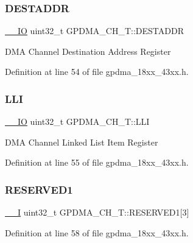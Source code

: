 \subsubsection{\texorpdfstring{D\+E\+S\+T\+A\+D\+DR}{DESTADDR}}
{\footnotesize\ttfamily \hyperlink{core__sc300_8h_aec43007d9998a0a0e01faede4133d6be}{\+\_\+\+\_\+\+IO} uint32\+\_\+t G\+P\+D\+M\+A\+\_\+\+C\+H\+\_\+\+T\+::\+D\+E\+S\+T\+A\+D\+DR}

D\+MA Channel Destination Address Register 

Definition at line 54 of file gpdma\+\_\+18xx\+\_\+43xx.\+h.

\mbox{\label{struct_g_p_d_m_a___c_h___t_a240936dbac9f3a949572b3dd196bd83f}} 
\subsubsection{\texorpdfstring{L\+LI}{LLI}}
{\footnotesize\ttfamily \hyperlink{core__sc300_8h_aec43007d9998a0a0e01faede4133d6be}{\+\_\+\+\_\+\+IO} uint32\+\_\+t G\+P\+D\+M\+A\+\_\+\+C\+H\+\_\+\+T\+::\+L\+LI}

D\+MA Channel Linked List Item Register 

Definition at line 55 of file gpdma\+\_\+18xx\+\_\+43xx.\+h.

\mbox{\label{struct_g_p_d_m_a___c_h___t_ae6a0ee831032674d792f9da150e3025e}} 
\subsubsection{\texorpdfstring{R\+E\+S\+E\+R\+V\+E\+D1}{RESERVED1}}
{\footnotesize\ttfamily \hyperlink{core__sc300_8h_af63697ed9952cc71e1225efe205f6cd3}{\+\_\+\+\_\+I} uint32\+\_\+t G\+P\+D\+M\+A\+\_\+\+C\+H\+\_\+\+T\+::\+R\+E\+S\+E\+R\+V\+E\+D1\mbox{[}3\mbox{]}}



Definition at line 58 of file gpdma\+\_\+18xx\+\_\+43xx.\+h.

\mbox{\label{struct_g_p_d_m_a___c_h___t_a734e1803144cdaa3cfab1507fa4f05d9}} 
